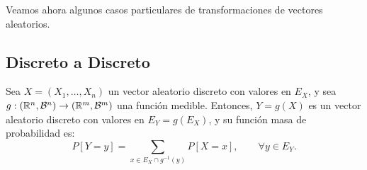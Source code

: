 Veamos ahora algunos casos particulares de transformaciones de vectores aleatorios.

\subsection{Discreto a Discreto}

Sea $X=(X_1, \ldots, X_n)$ un vector aleatorio discreto con valores en $E_X$, y sea $g:(\mathbb{R}^n, \mathcal{B}^n)\to (\mathbb{R}^m, \mathcal{B}^m)$ una función medible. Entonces, $Y=g(X)$ es un vector aleatorio discreto con valores en $E_Y=g(E_X)$, y su función masa de probabilidad es:
\begin{equation*}
    P[Y=y] = \sum_{x\in E_X\cap g^{-1}(y)} P[X=x],\qquad \forall y\in E_Y.
\end{equation*}



